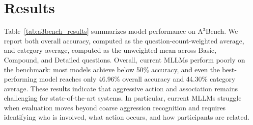 \section{Results}
Table~\ref{tab:a3bench_results} summarizes model performance on A$^3$Bench. We report both overall accuracy, computed as the question-count-weighted average, and category average, computed as the unweighted mean across Basic, Compound, and Detailed questions. Overall, current MLLMs perform poorly on the benchmark: most models achieve below 50\% accuracy, and even the best-performing model reaches only 46.96\% overall accuracy and 44.30\% category average. These results indicate that aggressive action and association remains challenging for state-of-the-art systems. In particular, current MLLMs struggle when evaluation moves beyond coarse aggression recognition and requires identifying who is involved, what action occurs, and how participants are related.

